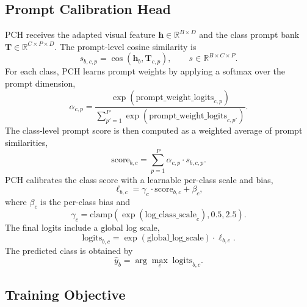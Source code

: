 \subsection{Prompt Calibration Head}
\label{sec:pch}

PCH receives the adapted visual feature $\mathbf{h} \in \mathbb{R}^{B \times D}$ and the class prompt bank $\mathbf{T} \in \mathbb{R}^{C \times P \times D}$. The prompt-level cosine similarity is
\begin{equation}
    s_{b,c,p} = \cos(\mathbf{h}_{b}, \mathbf{T}_{c,p}),
    \qquad s \in \mathbb{R}^{B \times C \times P}.
    \label{eq:pch_similarity}
\end{equation}
For each class, PCH learns prompt weights by applying a softmax over the prompt dimension,
\begin{equation}
    \alpha_{c,p} = \frac{\exp(\mathrm{prompt\_weight\_logits}_{c,p})}
    {\sum_{p'=1}^{P}\exp(\mathrm{prompt\_weight\_logits}_{c,p'})}.
    \label{eq:pch_prompt_weight}
\end{equation}
The class-level prompt score is then computed as a weighted average of prompt similarities,
\begin{equation}
    \mathrm{score}_{b,c} = \sum_{p=1}^{P} \alpha_{c,p} \cdot s_{b,c,p}.
    \label{eq:pch_class_score}
\end{equation}
PCH calibrates the class score with a learnable per-class scale and bias,
\begin{equation}
    \ell_{b,c} = \gamma_{c} \cdot \mathrm{score}_{b,c} + \beta_{c},
    \label{eq:pch_calibrated_logit}
\end{equation}
where $\beta_{c}$ is the per-class bias and
\begin{equation}
    \gamma_{c} = \mathrm{clamp}\left(\exp(\mathrm{log\_class\_scale}_{c}), 0.5, 2.5\right).
    \label{eq:pch_class_scale}
\end{equation}
The final logits include a global log scale,
\begin{equation}
    \mathrm{logits}_{b,c} = \exp(\mathrm{global\_log\_scale}) \cdot \ell_{b,c}.
    \label{eq:pch_global_scale}
\end{equation}
The predicted class is obtained by
\begin{equation}
    \hat{y}_{b} = \arg\max_{c} \; \mathrm{logits}_{b,c}.
    \label{eq:pch_prediction}
\end{equation}

\subsection{Training Objective}
\label{sec:training_objective}

